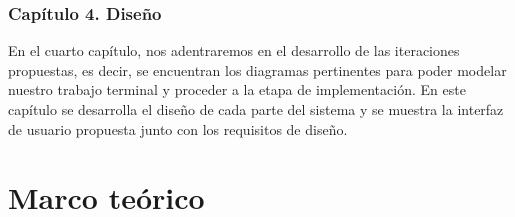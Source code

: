 \documentclass[12pt, a4paper, titlepage]{report}
\begin{document}
            \subsection*{Capítulo 4. Diseño}
                En el cuarto capítulo, nos adentraremos en el desarrollo de las iteraciones propuestas, es decir, se encuentran los diagramas pertinentes para poder modelar nuestro trabajo terminal y proceder a la etapa de implementación. En este capítulo se desarrolla el diseño de cada parte del sistema y se muestra la interfaz de usuario propuesta junto con los requisitos de diseño.

 \chapter{\textcolor{azulescom}{Marco teórico}}
\end{document}
